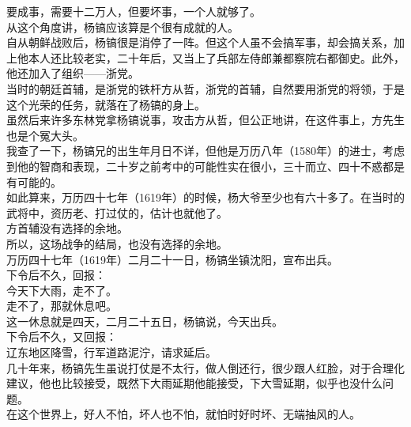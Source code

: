 \begin{multicols}{\theparacolNo}
要成事，需要十二万人，但要坏事，一个人就够了。\\

从这个角度讲，杨镐应该算是个很有成就的人。\\

自从朝鲜战败后，杨镐很是消停了一阵。但这个人虽不会搞军事，却会搞关系，加上他本人还比较老实，二十年后，又当上了兵部左侍郎兼都察院右都御史。此外，他还加入了组织——浙党。\\

当时的朝廷首辅，是浙党的铁杆方从哲，浙党的首辅，自然要用浙党的将领，于是这个光荣的任务，就落在了杨镐的身上。\\

虽然后来许多东林党拿杨镐说事，攻击方从哲，但公正地讲，在这件事上，方先生也是个冤大头。\\

我查了一下，杨镐兄的出生年月日不详，但他是万历八年（1580年）的进士，考虑到他的智商和表现，二十岁之前考中的可能性实在很小，三十而立、四十不惑都是有可能的。\\

如此算来，万历四十七年（1619年）的时候，杨大爷至少也有六十多了。在当时的武将中，资历老、打过仗的，估计也就他了。\\

方首辅没有选择的余地。\\

所以，这场战争的结局，也没有选择的余地。\\

万历四十七年（1619年）二月二十一日，杨镐坐镇沈阳，宣布出兵。\\

下令后不久，回报：\\

今天下大雨，走不了。\\

走不了，那就休息吧。\\

这一休息就是四天，二月二十五日，杨镐说，今天出兵。\\

下令后不久，又回报：\\

辽东地区降雪，行军道路泥泞，请求延后。\\

几十年来，杨镐先生虽说打仗是不太行，做人倒还行，很少跟人红脸，对于合理化建议，他也比较接受，既然下大雨延期他能接受，下大雪延期，似乎也没什么问题。\\

在这个世界上，好人不怕，坏人也不怕，就怕时好时坏、无端抽风的人。\\


\end{multicols}
